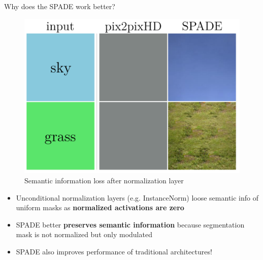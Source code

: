 \documentclass{beamer}
\begin{document}
\begin{frame}{Why does the SPADE work better?}
\begin{figure}
    \includegraphics[scale=0.15]{figures/info_loss.png} 
    \caption{Semantic information loss after normalization layer}
\end{figure}
\begin{itemize}[<+->]
    \item Unconditional normalization layers (e.g. InstanceNorm) loose semantic info of uniform masks as \textbf{normalized activations are zero}
    \item SPADE better \textbf{preserves semantic information} because segmentation mask is not normalized but only modulated
    \item SPADE also improves performance of traditional architectures!
\end{itemize}
\end{frame}

\end{document}
